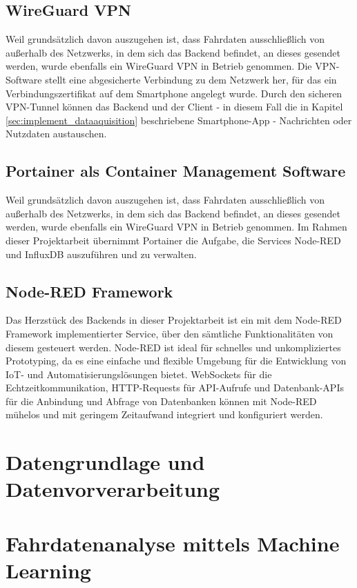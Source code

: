 \documentclass[oneside]{ausarbeitung}
\begin{document}
\subsection*{WireGuard VPN}
Weil grundsätzlich davon auszugehen ist, dass Fahrdaten ausschließlich von außerhalb des Netzwerks, in dem sich 
das Backend befindet, an dieses gesendet werden, wurde ebenfalls ein WireGuard VPN in Betrieb genommen.
Die VPN-Software stellt eine abgesicherte Verbindung zu dem Netzwerk her, für das ein 
Verbindungszertifikat auf dem Smartphone angelegt wurde. Durch den sicheren VPN-Tunnel können das Backend und der Client 
- in diesem Fall die in Kapitel \ref{sec:implement_dataaquisition} beschriebene Smartphone-App - Nachrichten oder 
Nutzdaten austauschen.

\subsection*{Portainer als Container Management Software}
Weil grundsätzlich davon auszugehen ist, dass Fahrdaten ausschließlich von außerhalb des Netzwerks, in dem sich 
das Backend befindet, an dieses gesendet werden, wurde ebenfalls ein WireGuard VPN in Betrieb genommen.
Im Rahmen dieser Projektarbeit übernimmt Portainer die Aufgabe, die Services Node-RED und InfluxDB auszuführen
und zu verwalten.

\subsection*{Node-RED Framework}
Das Herzstück des Backends in dieser Projektarbeit ist ein mit dem Node-RED Framework implementierter Service,
über den sämtliche Funktionalitäten von diesem gesteuert werden.
Node-RED ist ideal für schnelles und unkompliziertes Prototyping, da es eine einfache und flexible Umgebung für
die Entwicklung von IoT- und Automatisierungslösungen bietet. WebSockets für die Echtzeitkommunikation,
HTTP-Requests für API-Aufrufe und Datenbank-APIs für die Anbindung und Abfrage von Datenbanken können mit Node-RED 
mühelos und mit geringem Zeitaufwand integriert und konfiguriert werden.


\section{Datengrundlage und Datenvorverarbeitung}
\label{sec:implement_dataprocessing}

\section{Fahrdatenanalyse mittels Machine Learning}
\label{sec:implement_Fahrverhaltensanalyse}
\end{document}
